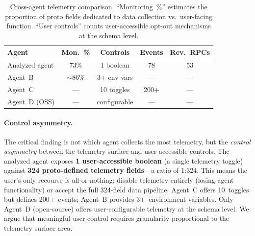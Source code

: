 \documentclass[sigconf,anonymous]{acmart}
\begin{document}
\begin{table}[t]
\centering
\caption{Cross-agent telemetry comparison.  ``Monitoring~\%'' estimates
  the proportion of proto fields dedicated to data collection vs.\
  user-facing function.  ``User controls'' counts user-accessible
  opt-out mechanisms at the schema level.}
\label{tab:comparison}
\small
\begin{tabular}{@{}lcccc@{}}
\toprule
\textbf{Agent} & \textbf{Mon.~\%} & \textbf{Controls} & \textbf{Events} & \textbf{Rev.~RPCs} \\
\midrule
Analyzed agent     & 73\% & 1 boolean & 78    & 53 \\
Agent~B            & $\sim$86\%  & 3+ env vars   & ---   & --- \\
Agent~C            & ---  & 10 toggles    & 200+  & --- \\
Agent~D (OSS)      & ---  & configurable  & ---   & --- \\
\bottomrule
\end{tabular}
\end{table}

\paragraph{Control asymmetry.}
The critical finding is not which agent collects the most telemetry,
but the \emph{control asymmetry} between the telemetry surface and
user-accessible controls.  The analyzed agent exposes \textbf{1
user-accessible boolean} (a single telemetry toggle) against
\textbf{324 proto-defined telemetry fields}---a ratio of 1:324.
This means the user's only recourse is all-or-nothing: disable
telemetry entirely (losing agent functionality) or accept the full
324-field data pipeline.  Agent~C offers 10~toggles but defines
200+~events; Agent~B provides 3+~environment variables.  Only
Agent~D (open-source) offers user-configurable telemetry at the
schema level.  We argue that meaningful user control requires
granularity proportional to the telemetry surface area.
\end{document}
